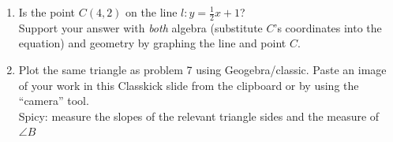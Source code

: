 \documentclass[12pt, twoside]{article}
\begin{document}
\begin{enumerate}
\newpage
\item Is the point $C(4,2)$ on the line $l: y=\frac{1}{2}x+1$? \\[0.5cm]
Support your answer with \emph{both} algebra (substitute $C$'s coordinates into the equation) and geometry by graphing the line and point $C$.
  \begin{flushright}
  \end{flushright}
    

\newpage
\item Plot the same triangle as problem 7 using Geogebra/classic. Paste an image of your work in this Classkick slide from the clipboard or by using the ``camera'' tool.\\[0.25cm]
Spicy: measure the slopes of the relevant triangle sides and the measure of $\angle B$

    
\end{enumerate}
\end{document}
